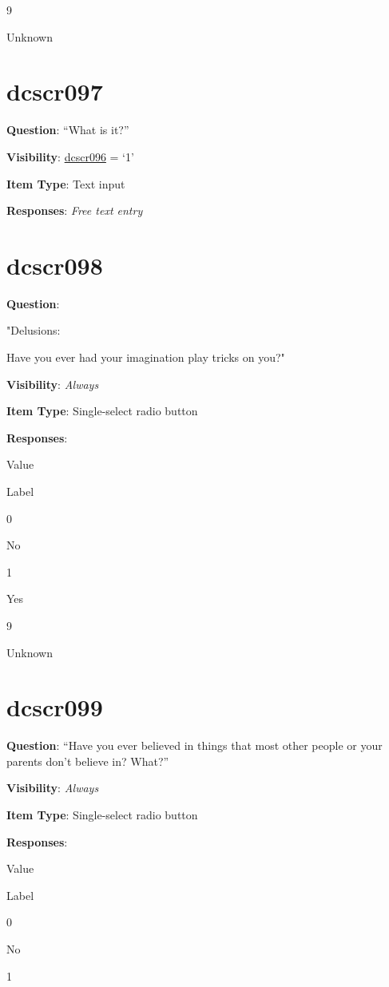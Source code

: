 \documentclass[]{book}
\begin{document}
9

Unknown

\hypertarget{dcscr097}{%
\section{dcscr097}\label{dcscr097}}

\textbf{Question}: ``What is it?''

\textbf{Visibility}: \protect\hyperlink{dcscr096}{dcscr096} = `1'

\textbf{Item Type}: Text input

\textbf{Responses}: \emph{Free text entry}

\hypertarget{dcscr098}{%
\section{dcscr098}\label{dcscr098}}

\textbf{Question}:

"Delusions:

Have you ever had your imagination play tricks on you?"

\textbf{Visibility}: \emph{Always}

\textbf{Item Type}: Single-select radio button

\textbf{Responses}:

Value

Label

0

No

1

Yes

9

Unknown

\hypertarget{dcscr099}{%
\section{dcscr099}\label{dcscr099}}

\textbf{Question}: ``Have you ever believed in things that most other people or your parents don't believe in? What?''

\textbf{Visibility}: \emph{Always}

\textbf{Item Type}: Single-select radio button

\textbf{Responses}:

Value

Label

0

No

1
\end{document}
